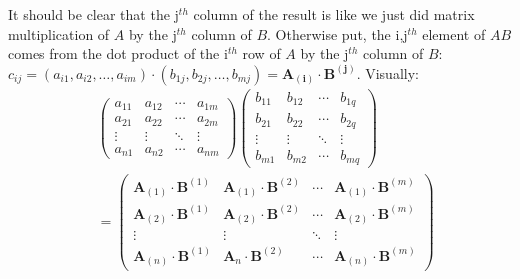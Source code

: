 \noindent It should be clear that the j$^{th}$ column of the result is like we just did matrix multiplication of $A$ by the j$^{th}$ column of $B$. Otherwise put, the i,j$^{th}$ element of $AB$ comes from the dot product of the i$^{th}$ row of $A$ by the j$^{th}$ column of $B$: $c_{ij}=(a_{i1}, a_{i2}, \dots , a_{im})\cdot(b_{1j},b_{2j},\dots,b_{mj})=\mathbf{A_{(i)}}\cdot\mathbf{B^{(j)}}$. Visually:
\begin{align*}
&
\begin{pmatrix}
a_{11} & a_{12} & \cdots & a_{1m} \\
a_{21} & a_{22} & \cdots & a_{2m} \\
\vdots & \vdots & \ddots & \vdots \\
a_{n1} & a_{n2} & \cdots & a_{nm}
\end{pmatrix}
\begin{pmatrix}
b_{11} & b_{12} & \cdots & b_{1q} \\
b_{21} & b_{22} & \cdots & b_{2q} \\
\vdots & \vdots & \ddots & \vdots \\
b_{m1} & b_{m2} & \cdots & b_{mq}
\end{pmatrix} \\
&=
\begin{pmatrix}
\mathbf{A}_{(1)}\cdot\mathbf{B}^{(1)} & \mathbf{A}_{(1)}\cdot\mathbf{B}^{(2)} & \cdots & \mathbf{A}_{(1)}\cdot\mathbf{B}^{(m)} \\
\mathbf{A}_{(2)}\cdot\mathbf{B}^{(1)} & \mathbf{A}_{(2)}\cdot\mathbf{B}^{(2)} & \cdots & \mathbf{A}_{(2)}\cdot\mathbf{B}^{(m)} \\
\vdots & \vdots & \ddots & \vdots \\
\mathbf{A}_{(n)}\cdot\mathbf{B}^{(1)} & \mathbf{A}_{n}\cdot\mathbf{B}^{(2)} & \cdots & \mathbf{A}_{(n)}\cdot\mathbf{B}^{(m)}
\end{pmatrix}
\end{align*}




